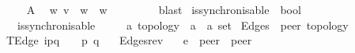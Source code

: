 \begin{isabellebody}
\ \ \isamarkupfalse%
\ A{}\ \isamarkupfalse%
\ {\isachardoublequoteopen}{\isasymexists}w{\isachardot}{\kern0pt}\ v\ {\isacharequal}{\kern0pt}\ w{\isasymdown}\isactrlsub {\isacharbang}{\kern0pt}\ {\isasymand}\ w\ {\isasymin}\ {\isasymT}\isactrlbsub {\isasymB}\ {}\isactrlesub {\isachardoublequoteclose}\isanewline
\ \ \ \ \isamarkupfalse%
\ blast\isanewline
{}\isamarkupfalse%
%
\endisatagproof
{\isafoldproof}%
%
\isadelimproof
%
\endisadelimproof
%
\isadelimdocument
%
\endisadelimdocument
%
\isatagdocument
%
\isamarkuptrue%
%
\endisatagdocument
{\isafolddocument}%
%
\isadelimdocument
%
\endisadelimdocument
{}\isamarkupfalse%
\ is{\isacharunderscore}{\kern0pt}synchronisable\ {\isacharcolon}{\kern0pt}{\isacharcolon}{\kern0pt}\ {\isachardoublequoteopen}bool{\isachardoublequoteclose}\ \isanewline
\ \ {\isachardoublequoteopen}is{\isacharunderscore}{\kern0pt}synchronisable\ {\isasymequiv}\ {\isasymL}\isactrlsub {\isasyminfinity}\ {\isacharequal}{\kern0pt}\ {\isasymL}\isactrlsub {\isasymzero}{\isachardoublequoteclose}\isanewline
\isanewline
{}\isamarkupfalse%
\ {\isacharprime}{\kern0pt}a\ topology\ {\isacharequal}{\kern0pt}\ {\isachardoublequoteopen}{\isacharparenleft}{\kern0pt}{\isacharprime}{\kern0pt}a\ {\isasymtimes}\ {\isacharprime}{\kern0pt}a{\isacharparenright}{\kern0pt}\ set{\isachardoublequoteclose}\isanewline
\isanewline
{}\isamarkupfalse%
\ Edges\ {\isacharcolon}{\kern0pt}{\isacharcolon}{\kern0pt}\ {\isachardoublequoteopen}{\isacharprime}{\kern0pt}peer\ topology{\isachardoublequoteclose}\ \ {\isacharparenleft}{\kern0pt}{\isachardoublequoteopen}{\isasymG}{\isachardoublequoteclose}\ {}{}{}{\isacharparenright}{\kern0pt}\ \isanewline
TEdge{\isacharcolon}{\kern0pt}\ {\isachardoublequoteopen}i\isactrlbsup p{\isasymrightarrow}q\isactrlesup \ {\isasymin}\ {\isasymM}\ {\isasymLongrightarrow}\ {\isacharparenleft}{\kern0pt}p{\isacharcomma}{\kern0pt}\ q{\isacharparenright}{\kern0pt}\ {\isasymin}\ {\isasymG}{\isachardoublequoteclose}\isanewline
\isanewline
{}\isamarkupfalse%
\ Edges{\isacharunderscore}{\kern0pt}rev{\isacharcolon}{\kern0pt}\isanewline
\ \ \ e\ {\isacharcolon}{\kern0pt}{\isacharcolon}{\kern0pt}\ {\isachardoublequoteopen}{\isacharprime}{\kern0pt}peer\ {\isasymtimes}\ {\isacharprime}{\kern0pt}peer{\isachardoublequoteclose}\isanewline

\end{isabellebody}
